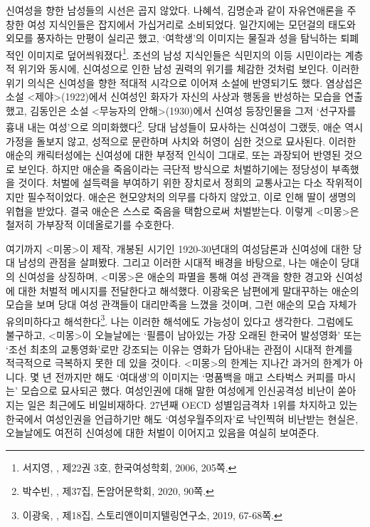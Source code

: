 신여성을 향한 남성들의 시선은 곱지 않았다. 나혜석, 김명순과 같이 자유연애론을 주창한 여성 지식인들은 잡지에서 가십거리로 소비되었다. 일간지에는 모던걸의 태도와 외모를 풍자하는 만평이 실리곤 했고, `여학생'의 이미지는 물질과 성을 탐닉하는 퇴폐적인 이미지로 덮어씌워졌다\footnote{서지영, ,  제22권 3호, 한국여성학회, 2006, 205쪽.}. 조선의 남성 지식인들은 식민지의 이등 시민이라는 계층적 위기와 동시에, 신여성으로 인한 남성 권력의 위기를 체감한 것처럼 보인다. 이러한 위기 의식은 신여성을 향한 적대적 시각으로 이어져 소설에 반영되기도 했다. 염상섭은 소설 <제야>(1922)에서 신여성인 화자가 자신의 사상과 행동을 반성하는 모습을 연출했고, 김동인은 소설 <무능자의 안해>(1930)에서 신여성 등장인물을 그저 `선구자를 흉내 내는 여성'으로 의미화했다\footnote{박수빈, ,  제37집, 돈암어문학회, 2020, 90쪽.}. 당대 남성들이 묘사하는 신여성이 그랬듯, 애순 역시 가정을 돌보지 않고, 성적으로 문란하며 사치와 허영이 심한 것으로 묘사된다. 이러한 애순의 캐릭터성에는 신여성에 대한 부정적 인식이 그대로, 또는 과장되어 반영된 것으로 보인다. 하지만 애순을 죽음이라는 극단적 방식으로 처벌하기에는 정당성이 부족했을 것이다. 처벌에 설득력을 부여하기 위한 장치로서 정희의 교통사고는 다소 작위적이지만 필수적이었다. 애순은 현모양처의 의무를 다하지 않았고, 이로 인해 딸이 생명의 위협을 받았다. 결국 애순은 스스로 죽음을 택함으로써 처벌받는다. 이렇게 <미몽>은 철저히 가부장적 이데올로기를 수호한다.

여기까지 <미몽>이 제작, 개봉된 시기인 1920-30년대의 여성담론과 신여성에 대한 당대 남성의 관점을 살펴봤다. 그리고 이러한 시대적 배경을 바탕으로, 나는 애순이 당대의 신여성을 상징하며, <미몽>은 애순의 파멸을 통해 여성 관객을 향한 경고와 신여성에 대한 처벌적 메시지를 전달한다고 해석했다. 이광욱은 남편에게 말대꾸하는 애순의 모습을 보며 당대 여성 관객들이 대리만족을 느꼈을 것이며, 그런 애순의 모습 자체가 유의미하다고 해석한다\footnote{이광욱, ,  제18집, 스토리앤이미지텔링연구소, 2019, 67-68쪽.}. 나는 이러한 해석에도 가능성이 있다고 생각한다. 그럼에도 불구하고, <미몽>이 오늘날에는 `필름이 남아있는 가장 오래된 한국어 발성영화' 또는 `조선 최초의 교통영화'로만 강조되는 이유는 영화가 담아내는 관점이 시대적 한계를 적극적으로 극복하지 못한 데 있을 것이다. <미몽>의 한계는 지나간 과거의 한계가 아니다. 몇 년 전까지만 해도 `여대생'의 이미지는 `명품백을 매고 스타벅스 커피를 마시는' 모습으로 묘사되곤 했다. 여성인권에 대해 말한 여성에게 인신공격성 비난이 쏟아지는 일은 최근에도 비일비재하다. 27년째 OECD 성별임금격차 1위를 차지하고 있는 한국에서 여성인권을 언급하기만 해도 `여성우월주의자'로 낙인찍혀 비난받는 현실은, 오늘날에도 여전히 신여성에 대한 처벌이 이어지고 있음을 여실히 보여준다.

